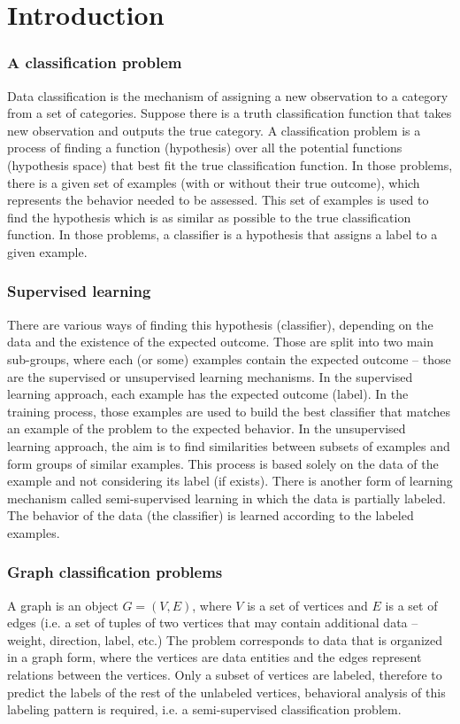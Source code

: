 \chapter{Introduction}
\label{chap:intro}

\subsection*{A classification problem}
Data classification is the mechanism of assigning a new observation to a category from a set of categories.
Suppose there is a truth classification function that takes new observation and outputs the true category. A classification problem is a process of finding a function (hypothesis) over all the potential functions (hypothesis space) that best fit the true classification function.
In those problems, there is a given set of examples (with or without their true outcome), which represents the behavior needed to be assessed. This set of examples is used to find the hypothesis which is as similar as possible to the true classification function.
In those problems, a classifier is a hypothesis that assigns a label to a given example.

\subsection*{Supervised learning}
There are various ways of finding this hypothesis (classifier), depending on the data and the existence of the expected outcome. Those are split into two main sub-groups, where each (or some) examples contain the expected outcome – those are the supervised or unsupervised learning mechanisms.
In the supervised learning approach, each example has the expected outcome (label). In the training process, those examples are used to build the best classifier that matches an example of the problem to the expected behavior.
In the unsupervised learning approach, the aim is to find similarities between subsets of examples and form groups of similar examples. This process is based solely on the data of the example and not considering its label (if exists).
There is another form of learning mechanism called semi-supervised learning in which the data is partially labeled. The behavior of the data (the classifier) is learned according to the labeled examples.

\subsection*{Graph classification problems}
A graph is an object $G=(V,E)$, where $V$ is a set of vertices and $E$ is a set of edges (i.e. a set of tuples of two vertices that may contain additional data – weight, direction, label, etc.)
The problem corresponds to data that is organized in a graph form, where the vertices are data entities and the edges represent relations between the vertices.
Only a subset of vertices are labeled, therefore to predict the labels of the rest of the unlabeled vertices, behavioral analysis of this labeling pattern is required, i.e. a semi-supervised classification problem.

